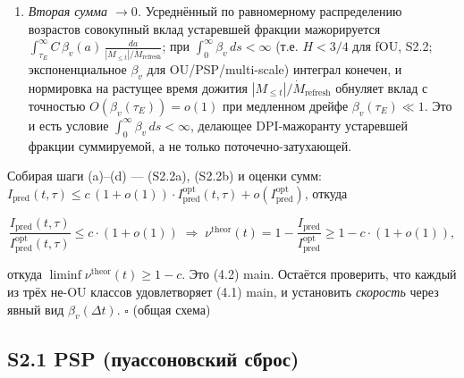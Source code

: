 \documentclass[12pt]{iopart}
\providecommand{\tightlist}{\setlength{\itemsep}{0pt}\setlength{\parskip}{0pt}}
\begin{document}
\begin{enumerate}

\def\labelenumi{(\alph{enumi})}

\setcounter{enumi}{3}

\tightlist

\item

  \emph{Вторая сумма \(\to 0\).} Усреднённый по равномерному распределению возрастов совокупный вклад устаревшей фракции мажорируется \(\int_{\tau_E}^\infty C\,\beta_v(a)\,\frac{da}{|M_{\le t}|/\dot M_{\text{refresh}}}\); при \(\int_0^\infty\beta_v\,ds < \infty\) (т.е. \(H < 3/4\) для fOU, S2.2; экспоненциальное \(\beta_v\) для OU/PSP/multi-scale) интеграл конечен, и нормировка на растущее время дожития \(|M_{\le t}|/\dot M_{\text{refresh}}\) обнуляет вклад с точностью \(O(\beta_v(\tau_E)) = o(1)\) при медленном дрейфе \(\beta_v(\tau_E) \ll 1\). Это и есть условие \(\int_0^\infty\beta_v\,ds < \infty\), делающее DPI-мажоранту устаревшей фракции суммируемой, а не только поточечно-затухающей.

\end{enumerate}



Собирая шаги (a)--(d) --- (S2.2a), (S2.2b) и оценки сумм: \(I_{\text{pred}}(t,\tau) \le c\,(1+o(1))\cdot I_{\text{pred}}^{\text{opt}}(t,\tau) + o(I_{\text{pred}}^{\text{opt}})\), откуда



\[\frac{I_{\text{pred}}(t,\tau)}{I_{\text{pred}}^{\text{opt}}(t,\tau)} \le c\cdot(1+o(1)) \;\Longrightarrow\; \nu^{\text{theor}}(t) = 1 - \frac{I_{\text{pred}}}{I_{\text{pred}}^{\text{opt}}} \ge 1 - c\cdot(1+o(1)),\]



откуда \(\liminf\nu^{\text{theor}}(t) \ge 1-c\). Это (4.2) main. Остаётся проверить, что каждый из трёх не-OU классов удовлетворяет (4.1) main, и установить \emph{скорость} через явный вид \(\beta_v(\Delta t)\). \(\square\) (общая схема)



\subsection{S2.1 PSP (пуассоновский сброс)}\label{s2.1-psp-ux43fux443ux430ux441ux441ux43eux43dux43eux432ux441ux43aux438ux439-ux441ux431ux440ux43eux441}
\end{document}
